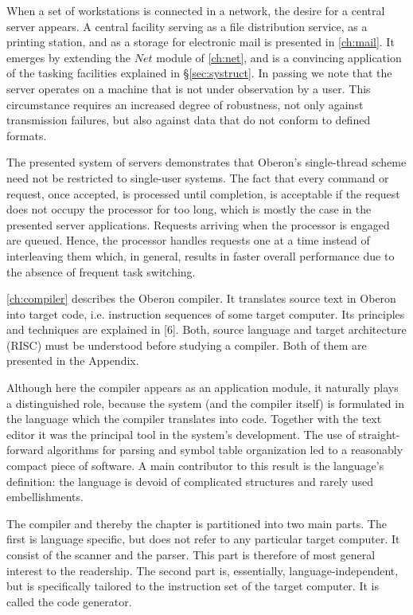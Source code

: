 When a set of workstations is connected in a network, the desire for a central server appears. A
central facility serving as a file distribution service, as a printing station, and as a storage for
electronic mail is presented in \ref{ch:mail}. It emerges by extending the $Net$ module of \ref{ch:net},
and is a convincing application of the tasking facilities explained in \S \ref{sec:systruct}.
In passing we note that the server operates on a machine that is not under observation by a user.
This circumstance requires an increased degree of robustness, not only against transmission failures,
but also against data that do not conform to defined formats.

The presented system of servers demonstrates that Oberon's single-thread scheme need not be
restricted to single-user systems. The fact that every command or request, once accepted, is
processed until completion, is acceptable if the request does not occupy the processor for too long,
which is mostly the case in the presented server applications. Requests arriving when the
processor is engaged are queued. Hence, the processor handles requests one at a time instead of
interleaving them which, in general, results in faster overall performance due to the absence of
frequent task switching.

\ref{ch:compiler} describes the Oberon compiler. It translates source text in Oberon into target code,
i.e. instruction sequences of some target computer. Its principles and techniques are explained in [6].
Both, source language and target architecture (RISC) must be understood before studying a compiler.
Both of them are presented in the Appendix.

Although here the compiler appears as an application module, it naturally plays a distinguished role,
because the system (and the compiler itself) is formulated in the language which the compiler
translates into code. Together with the text editor it was the principal tool in the system's
development. The use of straight-forward algorithms for parsing and symbol table organization led
to a reasonably compact piece of software. A main contributor to this result is the language's
definition: the language is devoid of complicated structures and rarely used embellishments.

The compiler and thereby the chapter is partitioned into two main parts. The first is language specific,
but does not refer to any particular target computer. It consist of the scanner and the
parser. This part is therefore of most general interest to the readership. The second part is,
essentially, language-independent, but is specifically tailored to the instruction set of the target
computer. It is called the code generator.

